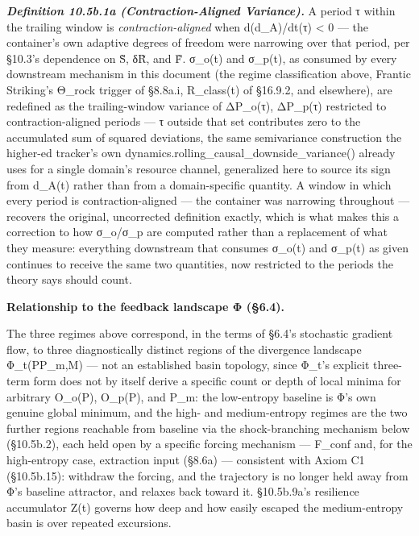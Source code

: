 \documentclass[
]{article}
\begin{document}
\emph{\textbf{Definition 10.5b.1a (Contraction-Aligned Variance).}} A period τ within the trailing window is \emph{contraction-aligned} when d(d\_A)/dt(τ) \textless{} 0 --- the container's own adaptive degrees of freedom were narrowing over that period, per §10.3's dependence on S̃, δR̃, and F̃. σ\_o(t) and σ\_p(t), as consumed by every downstream mechanism in this document (the regime classification above, Frantic Striking's Θ\_rock trigger of §8.8a.i, R\_class(t) of §16.9.2, and elsewhere), are redefined as the trailing-window variance of ΔP\_o(τ), ΔP\_p(τ) restricted to contraction-aligned periods --- τ outside that set contributes zero to the accumulated sum of squared deviations, the same semivariance construction the higher-ed tracker's own dynamics.rolling\_causal\_downside\_variance() already uses for a single domain's resource channel, generalized here to source its sign from d\_A(t) rather than from a domain-specific quantity. A window in which every period is contraction-aligned --- the container was narrowing throughout --- recovers the original, uncorrected definition exactly, which is what makes this a correction to how σ\_o/σ\_p are computed rather than a replacement of what they measure: everything downstream that consumes σ\_o(t) and σ\_p(t) as given continues to receive the same two quantities, now restricted to the periods the theory says should count.

\textbf{Relationship to the feedback landscape Φ (§6.4).}

The three regimes above correspond, in the terms of §6.4's stochastic
gradient flow, to three diagnostically distinct regions of the
divergence landscape Φ\_t(PP\_m,M) --- not an established basin
topology, since Φ\_t's explicit three-term form does not by itself
derive a specific count or depth of local minima for arbitrary O\_o(P),
O\_p(P), and P\_m: the low-entropy baseline is Φ's own genuine global
minimum, and the high- and medium-entropy regimes are the two further
regions reachable from baseline via the shock-branching mechanism below
(§10.5b.2), each held open by a specific forcing mechanism --- F\_conf
and, for the high-entropy case, extraction input (§8.6a) --- consistent
with Axiom C1 (§10.5b.15): withdraw the forcing, and the trajectory is
no longer held away from Φ's baseline attractor, and relaxes back toward
it. §10.5b.9a's resilience accumulator Z(t) governs how deep and how
easily escaped the medium-entropy basin is over repeated excursions.
\end{document}
